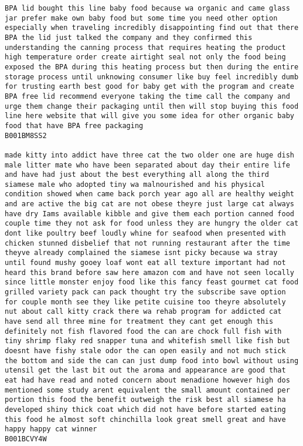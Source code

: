 \documentclass[11pt]{article}
\begin{document}
\begin{Verbatim}[commandchars=\\\{\}]
BPA lid bought this line baby food because wa organic and came glass jar prefer make own baby food but some time you need other option especially when traveling incredibly disappointing find out that there BPA the lid just talked the company and they confirmed this understanding the canning process that requires heating the product high temperature order create airtight seal not only the food being exposed the BPA during this heating process but then during the entire storage process until unknowing consumer like buy feel incredibly dumb for trusting earth best good for baby get with the program and create BPA free lid recommend everyone taking the time call the company and urge them change their packaging until then will stop buying this food line here website that will give you some idea for other organic baby food that have BPA free packaging
B001BM8SS2

made kitty into addict have three cat the two older one are huge dish male litter mate who have been separated about day their entire life and have had just about the best everything all along the third siamese male who adopted tiny wa malnourished and his physical condition showed when came back porch year ago all are healthy weight and are active the big cat are not obese theyre just large cat always have dry Iams available kibble and give them each portion canned food couple time they not ask for food unless they are hungry the older cat dont like poultry beef loudly whine for seafood when presented with chicken stunned disbelief that not running restaurant after the time theyve already complained the siamese isnt picky because wa stray until found mushy gooey loaf wont eat all texture important had not heard this brand before saw here amazon com and have not seen locally since little monster enjoy food like this fancy feast gourmet cat food grilled variety pack can pack thought try the subscribe save option for couple month see they like petite cuisine too theyre absolutely nut about call kitty crack there wa rehab program for addicted cat have send all three mine for treatment they cant get enough this definitely not fish flavored food the can are chock full fish with tiny shrimp flaky red snapper tuna and whitefish smell like fish but doesnt have fishy stale odor the can open easily and not much stick the bottom and side the can can just dump food into bowl without using utensil get the last bit out the aroma and appearance are good that eat had have read and noted concern about menadione however high dos mentioned some study arent equivalent the small amount contained per portion this food the benefit outweigh the risk best all siamese ha developed shiny thick coat which did not have before started eating this food he almost soft chinchilla look great smell great and have happy happy cat winner
B001BCVY4W


    \end{Verbatim}
\end{document}
